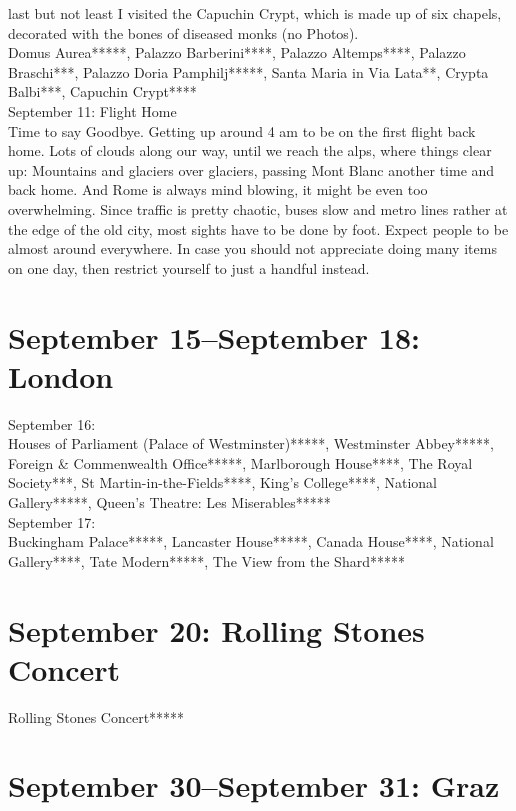 last but not least I visited the Capuchin Crypt, which is made up of six chapels, decorated with the bones of diseased monks (no Photos).\\

Domus Aurea*****, Palazzo Barberini****, Palazzo Altemps****, Palazzo Braschi***, Palazzo Doria Pamphilj*****, Santa Maria in Via Lata**, Crypta Balbi***, Capuchin Crypt****\\

September 11: Flight Home\\
Time to say Goodbye. Getting up around 4 am to be on the first flight back home. Lots of clouds along our way, until we reach the alps, where things clear up: Mountains and glaciers over glaciers, passing Mont Blanc another time and back home. And Rome is always mind blowing, it might be even too overwhelming. Since traffic is pretty chaotic, buses slow and metro lines rather at the edge of the old city, most sights have to be done by foot. Expect people to be almost around everywhere. In case you should not appreciate doing many items on one day, then restrict yourself to just a handful instead.


\section{September 15--September 18: London}
\label{London2017}

September 16:\\
Houses of Parliament (Palace of Westminster)*****, Westminster Abbey*****, Foreign \& Commenwealth Office*****, Marlborough House****, The Royal Society***, St Martin-in-the-Fields****, King's College****, National Gallery*****, Queen's Theatre: Les Miserables*****\\

September 17:\\
Buckingham Palace*****, Lancaster House*****, Canada House****, National Gallery****, Tate Modern*****, The View from the Shard*****

\section{September 20: Rolling Stones Concert}
\label{2017RollingStones}

Rolling Stones Concert*****

\section{September 30--September 31: Graz}
\label{Graz2017}

